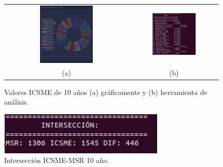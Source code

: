 \documentclass[a4paper, 12pt]{book}
\begin{document}
\begin{figure}[!h]
    \centering
    \begin{tabular}{cc}
    \includegraphics[width=0.45\textwidth]{img/icsme_10_year_graph.png} &  
    \includegraphics[width=0.52\textwidth]{img/icsme_10_year.png} \\ 
    (a) &(b) 
    \end{tabular}
    \caption{Valores ICSME de 10 años (a) gráficamente y (b) herramienta de análisis.}
    \label{fig:comp_icsme_10_year}
\end{figure}

\begin{figure}[h]
  \centering
  \includegraphics[width=8cm, keepaspectratio]{img/inter_10_year.png}
  \caption{Intersección ICSME-MSR 10 año.}
  \label{fig:inter_10_year}
\end{figure}


\end{document}
